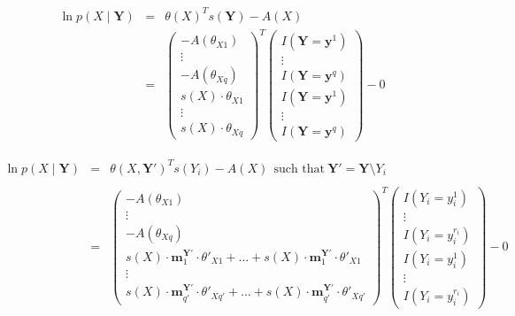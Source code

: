 \documentclass[11pt, oneside]{article}   	%
\numberwithin{figure}{section}
\numberwithin{equation}{section}
\numberwithin{table}{section}
\theoremstyle{definition}
\begin{document}
\begin{appendices}
\begin{itemize}
\begin{eqnarray*}
\ln p(X \mid \mathbf{Y}) &=& \theta(X)^T s(\mathbf{Y}) - A(X) \\
&=&
\begin{pmatrix}
- A(\theta_{X1}) \\
\vdots \\
- A(\theta_{Xq})\\
s(X) \cdot \theta_{X1}\\
\vdots \\
s(X) \cdot \theta_{Xq}
\end{pmatrix}^T
\begin{pmatrix}
I(\mathbf{Y} =\mathbf{y}^1) \\
\vdots \\
I(\mathbf{Y} =\mathbf{y}^q) \\
I(\mathbf{Y} =\mathbf{y}^1) \\
\vdots \\
I(\mathbf{Y} =\mathbf{y}^q)
\end{pmatrix}
- 0
\end{eqnarray*}

\end{itemize}



\begin{eqnarray*}
\ln p(X\mid \mathbf{Y}) &=& \theta(X, \mathbf{Y'} )^T s(Y_i) - A(X) ~~\textrm{such~that} ~\mathbf{Y'} = \mathbf{Y} \setminus Y_i \\ \\
&=&
\begin{pmatrix}
- A(\theta_{X1}) \\
\vdots \\
- A(\theta_{Xq})\\
\! s(X) \cdot  \mathbf{m}^{\mathbf{Y'}}_1 \cdot \theta'_{X1}  +  \ldots + s(X) \cdot \mathbf{m}^{\mathbf{Y'}}_1 \cdot \theta'_{X1}\\
\vdots \\
\! s(X) \cdot  \mathbf{m}^{\mathbf{Y'}}_{q'} \cdot \theta'_{Xq'}   + \ldots + s(X) \cdot  \mathbf{m}^{\mathbf{Y'}}_{q'} \cdot \theta'_{Xq'}
\end{pmatrix}^T \!
\begin{pmatrix}
I(Y_i=y_i^1) \! \\
\vdots \\
I(Y_i=y_i^{r_i}) \!\\
I(Y_i=y_i^1) \! \\
\vdots \\
I(Y_i=y_i^{r_i}) \!
\end{pmatrix}
- 0 \!
\end{eqnarray*}



\end{appendices}
\end{document}
